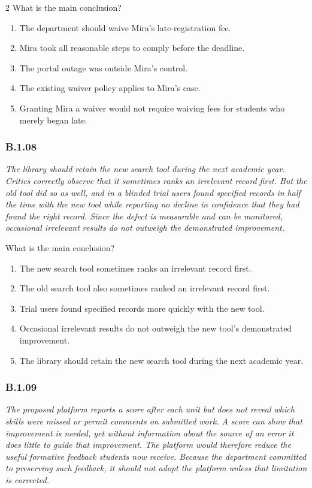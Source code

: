 \documentclass[10pt]{extarticle}
\newcommand{\choice}[1]{\item #1}
\newcommand{\bankitem}[1]{\subsubsection*{#1}}
\begin{document}
\begin{multicols}{2}
What is the main conclusion?
\begin{enumerate}[label=(\alph*)]
  \choice{The department should waive Mira's late-registration fee.}
  \choice{Mira took all reasonable steps to comply before the deadline.}
  \choice{The portal outage was outside Mira's control.}
  \choice{The existing waiver policy applies to Mira's case.}
  \choice{Granting Mira a waiver would not require waiving fees for students who merely began late.}
\end{enumerate}
\bankitem{B.1.08}
\emph{The library should retain the new search tool during the next academic year. Critics correctly observe that it sometimes ranks an irrelevant record first. But the old tool did so as well, and in a blinded trial users found specified records in half the time with the new tool while reporting no decline in confidence that they had found the right record. Since the defect is measurable and can be monitored, occasional irrelevant results do not outweigh the demonstrated improvement.}

What is the main conclusion?
\begin{enumerate}[label=(\alph*)]
  \choice{The new search tool sometimes ranks an irrelevant record first.}
  \choice{The old search tool also sometimes ranked an irrelevant record first.}
  \choice{Trial users found specified records more quickly with the new tool.}
  \choice{Occasional irrelevant results do not outweigh the new tool's demonstrated improvement.}
  \choice{The library should retain the new search tool during the next academic year.}
\end{enumerate}
\bankitem{B.1.09}
\emph{The proposed platform reports a score after each unit but does not reveal which skills were missed or permit comments on submitted work. A score can show that improvement is needed, yet without information about the source of an error it does little to guide that improvement. The platform would therefore reduce the useful formative feedback students now receive. Because the department committed to preserving such feedback, it should not adopt the platform unless that limitation is corrected.}


\end{multicols}
\end{document}

